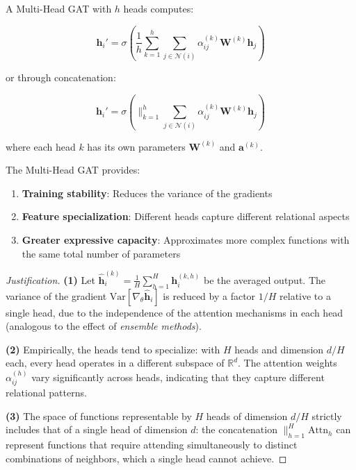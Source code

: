 \begin{definition}\label{def:multihead_gat}
A Multi-Head GAT with $h$ heads computes:

\begin{equation}
    \mathbf{h}_i' = \sigma\left(\frac{1}{h}\sum_{k=1}^{h} \sum_{j \in \mathcal{N}(i)} \alpha_{ij}^{(k)} \mathbf{W}^{(k)}\mathbf{h}_j\right)
    \label{eq:multihead_gat_average}
\end{equation}

or through concatenation:

\begin{equation}
    \mathbf{h}_i' = \sigma\left(\|_{k=1}^{h} \sum_{j \in \mathcal{N}(i)} \alpha_{ij}^{(k)} \mathbf{W}^{(k)}\mathbf{h}_j\right)
    \label{eq:multihead_gat_concat}
\end{equation}

where each head $k$ has its own parameters $\mathbf{W}^{(k)}$ and $\mathbf{a}^{(k)}$.
\end{definition}

\begin{proposition}\label{prop:multihead_gat_advantages}
The Multi-Head GAT provides:
\begin{enumerate}
    \item \textbf{Training stability}: Reduces the variance of the gradients
    \item \textbf{Feature specialization}: Different heads capture different relational aspects
    \item \textbf{Greater expressive capacity}: Approximates more complex functions with the same total number of parameters
\end{enumerate}
\end{proposition}

\begin{proof}[Justification]
\textbf{(1)} Let $\hat{\mathbf{h}}_i^{(k)} = \frac{1}{H}\sum_{h=1}^H \mathbf{h}_i^{(k,h)}$ be the averaged output. The variance of the gradient $\text{Var}[\nabla_\theta \hat{\mathbf{h}}_i]$ is reduced by a factor $1/H$ relative to a single head, due to the independence of the attention mechanisms in each head (analogous to the effect of \textit{ensemble methods}).

\textbf{(2)} Empirically, the heads tend to specialize: with $H$ heads and dimension $d/H$ each, every head operates in a different subspace of $\mathbb{R}^d$. The attention weights $\alpha_{ij}^{(h)}$ vary significantly across heads, indicating that they capture different relational patterns.

\textbf{(3)} The space of functions representable by $H$ heads of dimension $d/H$ strictly includes that of a single head of dimension $d$: the concatenation $\|_{h=1}^H \text{Attn}_h$ can represent functions that require attending simultaneously to distinct combinations of neighbors, which a single head cannot achieve.
\end{proof}

